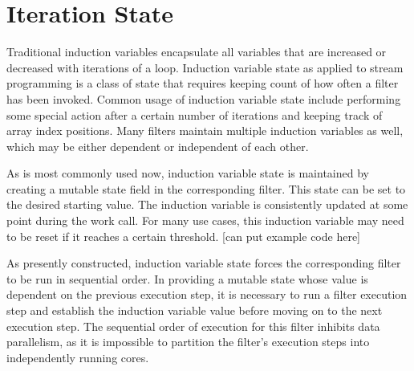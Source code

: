 \section{Iteration State}

Traditional induction variables encapsulate all variables that are increased or decreased with iterations of a loop.  Induction variable state as applied to stream programming is a class of state that requires keeping count of how often a filter has been invoked.  Common usage of induction variable state include performing some special action after a certain number of iterations and keeping track of array index positions.  Many filters maintain multiple induction variables as well, which may be either dependent or independent of each other.

As is most commonly used now, induction variable state is maintained by creating a mutable state field in the corresponding filter.  This state can be set to the desired starting value.  The induction variable is consistently updated at some point during the work call.  For many use cases, this induction variable may need to be reset if it reaches a certain threshold. [can put example code here] 

As presently constructed, induction variable state forces the corresponding filter to be run in sequential order.  In providing a mutable state whose value is dependent on the previous execution step, it is necessary to run a filter execution step and establish the induction variable value before moving on to the next execution step.  The sequential order of execution for this filter inhibits data parallelism, as it is impossible to partition the filter's execution steps into independently running cores.


